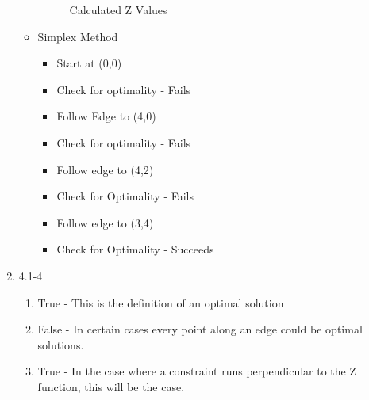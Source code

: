 \documentclass[12pt, letter]{article}
\begin{document}
\begin{enumerate}
\begin{itemize}
\begin{figure}[h]
	\caption{Calculated Z Values}
	\label{fig:p4b}
\end{figure}
\item Simplex Method
\begin{itemize}
	\item Start at (0,0)
	\item Check for optimality - Fails
	\item Follow Edge to (4,0)
	\item Check for optimality - Fails
	\item Follow edge to (4,2)
	\item Check for Optimality - Fails
	\item Follow edge to (3,4)
	\item Check for Optimality - Succeeds
\end{itemize}
\end{itemize}
\item 4.1-4
\begin{enumerate}
	\item True - This is the definition of an optimal solution
	\item False - In certain cases every point along an edge could be optimal solutions.
	\item True - In the case where a constraint runs perpendicular to the Z function, this will be the case.
\end{enumerate}
\end{enumerate}
\end{document}
